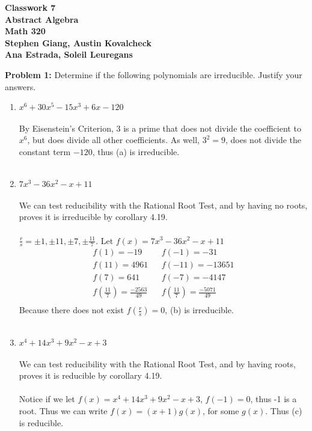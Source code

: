 \documentclass[12pt]{article}
\begin{document}
	
	\begin{center}
		\textbf{Classwork 7} \\
		\textbf{Abstract Algebra} \\
		\textbf{Math 320} \\
		\textbf{Stephen Giang, Austin Kovalcheck} \\
		\textbf{Ana Estrada, Soleil Leuregans} \\
	\end{center}

\noindent \textbf{Problem 1: }Determine if the following polynomials are irreducible. Justify your answers.

	\begin{enumerate}[label = (\alph*)]
		\item $x^6 + 30x^5 - 15x^3 + 6x - 120$
		\\ \\
		By Eisenstein's Criterion, $3$ is a prime that does not divide the coefficient to $x^6$, but does divide all other coefficients.  As well, $3^2 = 9$, does not divide the constant term $-120$, thus (a) is irreducible.
		\\ \\
		\item $7x^3 - 36x^2 -x +11$
		\\ \\
		We can test reducibility with the Rational Root Test, and by having no roots, proves it is irreducible by corollary 4.19.
		\\ \\
		$\frac{r}{s} = \pm 1, \pm 11, \pm 7,\pm \frac{11}{7}$.  Let $f(x) =7x^3 - 36x^2 -x +11$
		\begin{align*}
			f(1) = -19 && f(-1) = -31 \\
			f(11) = 4961 && f(-11) = -13651 \\
			f(7) = 641 && f(-7) = -4147 \\
			f\left(\frac{11}{7}\right) = \frac{-2563}{49}&& f\left(\frac{11}{7}\right) = \frac{-5071}{49}\\
		\end{align*}
		Because there does not exist $f(\frac{r}{s}) = 0$, (b) is irreducible.
		\\ \\
		\item $x^4 + 14x^3 + 9x^2 - x + 3$
		\\ \\
		We can test reducibility with the Rational Root Test, and by having roots, proves it is reducible by corollary 4.19.
		\\ \\
		Notice if we let $f(x) = x^4 + 14x^3 + 9x^2 - x + 3$, $f(-1) = 0$, thus -1 is a root. Thus we can write $f(x) = (x + 1)g(x)$, for some $g(x)$.  Thus (c) is reducible. 
	\end{enumerate}
\end{document}
